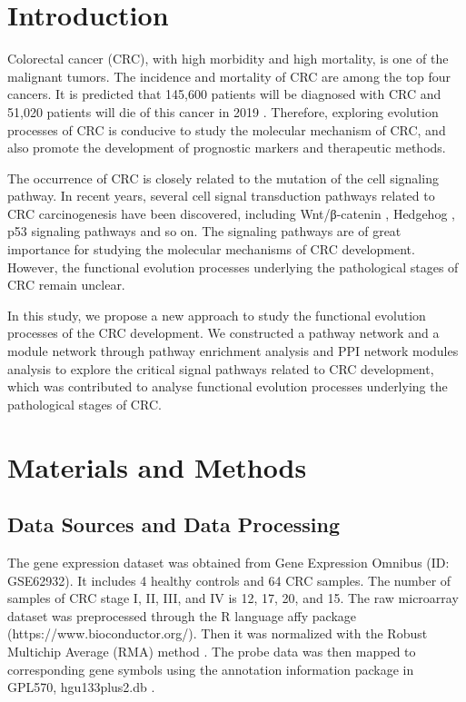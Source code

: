 \documentclass[conference]{IEEEtran}
\begin{document}
\section{Introduction}

Colorectal cancer (CRC), with high morbidity and high mortality, is one of the malignant tumors. The incidence and mortality of CRC are among the top four cancers. It is predicted that 145,600 patients will be diagnosed with CRC and 51,020 patients will die of this cancer in 2019 \cite{siegel2019cancer}. Therefore, exploring evolution processes of CRC is conducive to study the molecular mechanism of CRC, and also promote the development of prognostic markers and therapeutic methods.

The occurrence of CRC is closely related to the mutation of the cell signaling pathway. In recent years, several cell signal transduction pathways related to CRC carcinogenesis have been discovered, including Wnt/β-catenin \cite{klaus2008wnt}, Hedgehog \cite{you2010ptch1}, p53 \cite{li2015p53} signaling pathways and so on. The signaling pathways are of great importance for studying the molecular mechanisms of CRC development. However, the functional evolution processes underlying the pathological stages of CRC remain unclear.

In this study, we propose a new approach to study the functional evolution processes of the CRC development. We constructed a pathway network and a module network through pathway enrichment analysis and PPI network modules analysis to explore the critical signal pathways related to CRC development, which was contributed to analyse functional evolution processes underlying the pathological stages of CRC.

\section{Materials and Methods}



\subsection{Data Sources and Data Processing}
The gene expression dataset was obtained from Gene Expression Omnibus (ID: GSE62932). 
It includes 4 healthy controls and 64 CRC samples. 
The number of samples of CRC stage I, II, III, and IV is 12, 17, 20, and 15. 
The raw microarray dataset was preprocessed through the R language affy package (https://www.bioconductor.org/). 
Then it was normalized with the Robust Multichip Average (RMA) method \cite{gautier2004affy}. 
The probe data was then mapped to corresponding gene symbols using the annotation information package in GPL570, hgu133plus2.db \cite{carlson2016hgu133plus2}.
\end{document}
